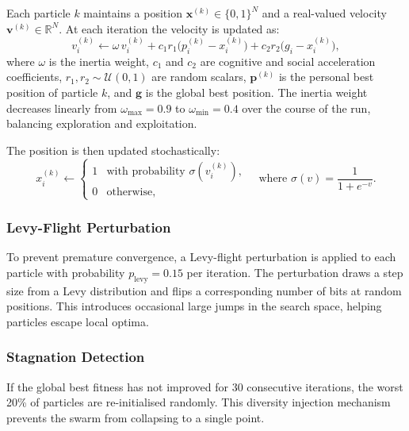 \documentclass[12pt,a4paper]{article}
\begin{document}
Each particle $k$ maintains a position $\mathbf{x}^{(k)} \in \{0,1\}^N$ and a real-valued velocity $\mathbf{v}^{(k)} \in \mathbb{R}^N$.
At each iteration the velocity is updated as:
\begin{equation}
  v_i^{(k)} \leftarrow \omega\, v_i^{(k)} + c_1 r_1 \bigl(p_i^{(k)} - x_i^{(k)}\bigr) + c_2 r_2 \bigl(g_i - x_i^{(k)}\bigr),
  \label{eq:pso_vel}
\end{equation}
where $\omega$ is the inertia weight, $c_1$ and $c_2$ are cognitive and social acceleration coefficients, $r_1, r_2 \sim \mathcal{U}(0,1)$ are random scalars, $\mathbf{p}^{(k)}$ is the personal best position of particle $k$, and $\mathbf{g}$ is the global best position.
The inertia weight decreases linearly from $\omega_{\max} = 0.9$ to $\omega_{\min} = 0.4$ over the course of the run, balancing exploration and exploitation.

The position is then updated stochastically:
\begin{equation}
  x_i^{(k)} \leftarrow \begin{cases} 1 & \text{with probability } \sigma(v_i^{(k)}), \\ 0 & \text{otherwise,} \end{cases}
  \quad \text{where } \sigma(v) = \frac{1}{1 + e^{-v}}.
  \label{eq:pso_pos}
\end{equation}

\subsubsection*{Levy-Flight Perturbation}

To prevent premature convergence, a Levy-flight perturbation is applied to each particle with probability $p_{\text{levy}} = 0.15$ per iteration.
The perturbation draws a step size from a Levy distribution and flips a corresponding number of bits at random positions.
This introduces occasional large jumps in the search space, helping particles escape local optima.

\subsubsection*{Stagnation Detection}

If the global best fitness has not improved for 30 consecutive iterations, the worst 20\% of particles are re-initialised randomly.
This diversity injection mechanism prevents the swarm from collapsing to a single point.
\end{document}
